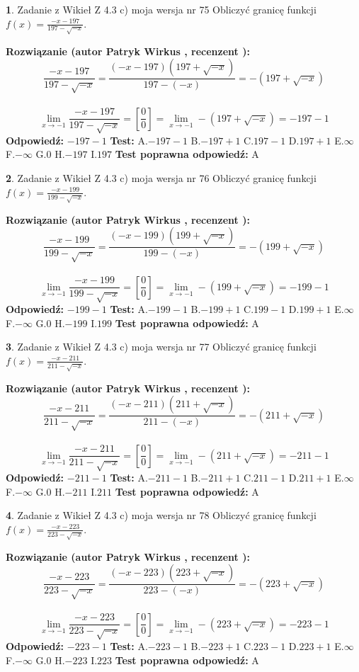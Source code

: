 \documentclass[12pt, a4paper]{article}
\theoremstyle{definition} %
\newtheorem{zad}{}
\newcommand{\zadStart}[1]{\begin{zad}#1\newline}
\newcommand{\zadStop}{\end{zad}}
\newcommand{\rozwStart}[2]{\noindent \textbf{Rozwiązanie (autor #1 , recenzent #2): }\newline}
\newcommand{\rozwStop}{\newline}
\newcommand{\odpStart}{\noindent \textbf{Odpowiedź:}\newline}
\newcommand{\odpStop}{\newline}
\newcommand{\testStart}{\noindent \textbf{Test:}\newline}
\newcommand{\testStop}{\newline}
\newcommand{\kluczStart}{\noindent \textbf{Test poprawna odpowiedź:}\newline}
\newcommand{\kluczStop}{\newline}
\begin{document}
\zadStart{Zadanie z Wikieł Z 4.3 c) moja wersja nr 75}
Obliczyć granicę funkcji $f(x)=\frac{-x-197}{197-\sqrt{-x}}$.
\zadStop
\rozwStart{Patryk Wirkus}{}
$$\frac{-x-197}{197-\sqrt{-x}}=\frac{(-x-197)(197+\sqrt{-x})}{197-(-x)}=-(197+\sqrt{-x})$$
\\
$$\lim\limits_{x\to-1}\frac{-x-197}{197-\sqrt{-x}}=[\frac{0}{0}]=\lim\limits_{x\to-1}-(197+\sqrt{-x}) =-197-1$$
\rozwStop
\odpStart
$-197-1$
\odpStop
\testStart
A.$-197-1$
B.$-197+1$
C.$197-1$
D.$197+1$
E.$\infty$
F.$-\infty$
G.$0$
H.$-197$
I.$197$
\testStop
\kluczStart
A
\kluczStop



\zadStart{Zadanie z Wikieł Z 4.3 c) moja wersja nr 76}
Obliczyć granicę funkcji $f(x)=\frac{-x-199}{199-\sqrt{-x}}$.
\zadStop
\rozwStart{Patryk Wirkus}{}
$$\frac{-x-199}{199-\sqrt{-x}}=\frac{(-x-199)(199+\sqrt{-x})}{199-(-x)}=-(199+\sqrt{-x})$$
\\
$$\lim\limits_{x\to-1}\frac{-x-199}{199-\sqrt{-x}}=[\frac{0}{0}]=\lim\limits_{x\to-1}-(199+\sqrt{-x}) =-199-1$$
\rozwStop
\odpStart
$-199-1$
\odpStop
\testStart
A.$-199-1$
B.$-199+1$
C.$199-1$
D.$199+1$
E.$\infty$
F.$-\infty$
G.$0$
H.$-199$
I.$199$
\testStop
\kluczStart
A
\kluczStop



\zadStart{Zadanie z Wikieł Z 4.3 c) moja wersja nr 77}
Obliczyć granicę funkcji $f(x)=\frac{-x-211}{211-\sqrt{-x}}$.
\zadStop
\rozwStart{Patryk Wirkus}{}
$$\frac{-x-211}{211-\sqrt{-x}}=\frac{(-x-211)(211+\sqrt{-x})}{211-(-x)}=-(211+\sqrt{-x})$$
\\
$$\lim\limits_{x\to-1}\frac{-x-211}{211-\sqrt{-x}}=[\frac{0}{0}]=\lim\limits_{x\to-1}-(211+\sqrt{-x}) =-211-1$$
\rozwStop
\odpStart
$-211-1$
\odpStop
\testStart
A.$-211-1$
B.$-211+1$
C.$211-1$
D.$211+1$
E.$\infty$
F.$-\infty$
G.$0$
H.$-211$
I.$211$
\testStop
\kluczStart
A
\kluczStop



\zadStart{Zadanie z Wikieł Z 4.3 c) moja wersja nr 78}
Obliczyć granicę funkcji $f(x)=\frac{-x-223}{223-\sqrt{-x}}$.
\zadStop
\rozwStart{Patryk Wirkus}{}
$$\frac{-x-223}{223-\sqrt{-x}}=\frac{(-x-223)(223+\sqrt{-x})}{223-(-x)}=-(223+\sqrt{-x})$$
\\
$$\lim\limits_{x\to-1}\frac{-x-223}{223-\sqrt{-x}}=[\frac{0}{0}]=\lim\limits_{x\to-1}-(223+\sqrt{-x}) =-223-1$$
\rozwStop
\odpStart
$-223-1$
\odpStop
\testStart
A.$-223-1$
B.$-223+1$
C.$223-1$
D.$223+1$
E.$\infty$
F.$-\infty$
G.$0$
H.$-223$
I.$223$
\testStop
\kluczStart
A
\kluczStop
\end{document}
